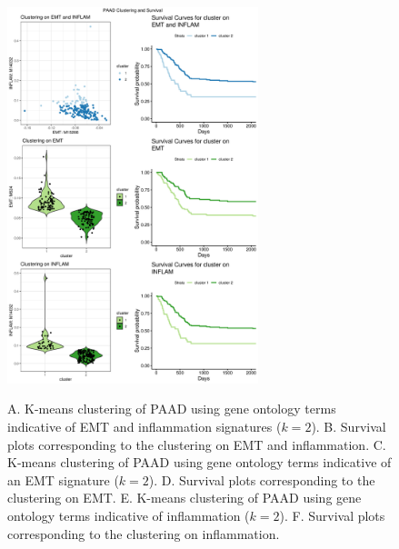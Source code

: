 \documentclass[11pt]{article}
\begin{document}
\begin{figure}
\center
{\includegraphics[width=0.65\textwidth]{Figure6/PAAD.pdf}}
\caption{A. K-means clustering of PAAD using gene ontology terms indicative of EMT and inflammation signatures ($k=2$).
B. Survival plots corresponding to the clustering on EMT and inflammation.
C. K-means clustering of PAAD using gene ontology terms indicative of an EMT signature ($k=2$).
D. Survival plots corresponding to the clustering on EMT.
E. K-means clustering of PAAD using gene ontology terms indicative of inflammation ($k=2$).
F. Survival plots corresponding to the clustering on inflammation.}
\label{fig:PAAD}
\end{figure}




\end{document}
